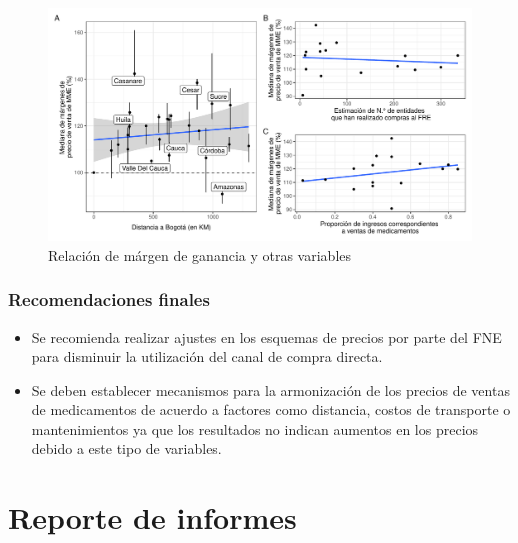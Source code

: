 \documentclass[
]{book}
\begin{document}
\begin{figure}

{\centering \includegraphics[width=0.95\linewidth]{InformeFinal_files/figure-latex/relacionMargenesCosto-1} 

}

\caption{Relación de márgen de ganancia y otras variables}\label{fig:relacionMargenesCosto}
\end{figure}

\hypertarget{recomendaciones-finales}{%
\subsection{Recomendaciones finales}\label{recomendaciones-finales}}

\begin{itemize}
\item
  Se recomienda realizar ajustes en los esquemas de precios por parte del FNE para disminuir la utilización del canal de compra directa.
\item
  Se deben establecer mecanismos para la armonización de los precios de ventas de medicamentos de acuerdo a factores como distancia, costos de transporte o mantenimientos ya que los resultados no indican aumentos en los precios debido a este tipo de variables.
\end{itemize}

\hypertarget{reporte-de-informes}{%
\chapter{Reporte de informes}\label{reporte-de-informes}}

\end{document}
